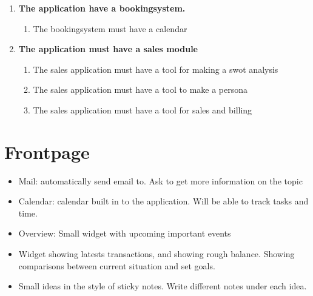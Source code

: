 \begin{enumerate}
\begin{enumerate}
\begin{enumerate}
            \item \textbf{The application have a bookingsystem.}
            \begin{enumerate}
                \item The bookingsystem must have a calendar
            \end{enumerate}
            \item \textbf{The application must have a sales module}
            \begin{enumerate}
                \item The sales application must have a tool for making a swot analysis
                \item The sales application must have a tool to make a persona
                \item The sales application must have a tool for sales and billing
            \end{enumerate}
        \end{enumerate}
    \end{enumerate}
\end{enumerate}

\section{Frontpage}
\begin{itemize}
	\item Mail: automatically send email to. Ask to get more information on the topic
	\item Calendar: calendar built in to the application. Will be able to track tasks and time.
	\item Overview: Small widget with upcoming important events
	\item Widget showing latests transactions, and showing rough balance. Showing comparisons between current situation and set goals.
	\item Small ideas in the style of sticky notes. Write different notes under each idea.
\end{itemize}

